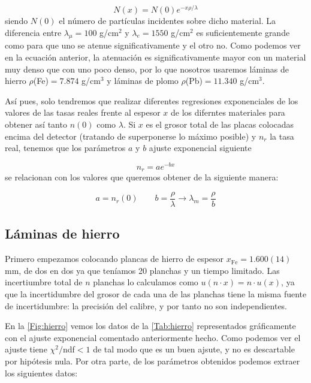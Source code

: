\documentclass[11pt]{article}
\begin{document}
\begin{equation}
	N(x)  = N(0) e^{-x\rho/\lambda}
\end{equation}
siendo $N(0)$ el número de partículas incidentes sobre dicho material. La diferencia entre $\lambda_\mu=100$ g/cm$^2$ y $\lambda_e=1550$ g/cm$^2$ es suficientemente grande como para que uno se atenue significativamente y el otro no. Como podemos ver en la ecuación anterior, la atenuación es significativamente mayor con un material muy denso que con uno poco denso, por lo que nosotros usaremos láminas de hierro $\rho$(Fe)$=7.874$ g/cm$^3$ y láminas de plomo $\rho$(Pb)$=11.340$ g/cm$^3$. 

Así pues, solo tendremos que realizar diferentes regresiones exponenciales de los valores de las tasas reales frente al espesor $x$ de los diferntes materiales para obtener así tanto $n(0)$ como $\lambda$. Si $x$ es el grosor total de las placas colocadas encima del detector (tratando de superponerse lo máximo posible) y $n_r$ la tasa real, tenemos que los parámetros $a$ y $b$ ajuste exponencial siguiente

\begin{equation}
	n_r = a e^{-bx}
\end{equation}
se relacionan con los valores que queremos obtener de la siguiente manera:

\begin{equation}
	a = n_r(0) \qquad b = \frac{\rho}{\lambda} \rightarrow \lambda_m = \frac{\rho}{b}
\end{equation}



\subsection{Láminas de hierro}

Primero empezamos colocando plancas de hierro de espesor $x_{\text{Fe}}=1.600(14)$ mm, de dos en dos ya que teníamos 20 planchas y un tiempo limitado. Las incertiumbre total de $n$ planchas lo calculamos como $u(n\cdot x) = n \cdot u(x)$, ya que la incertidumbre del grosor de cada una de las planchas tiene la misma fuente de incertidumbre: la precisión del calibre, y por tanto no son independientes. 

En la \cref{Fig:hierro} vemos los datos de la \cref{Tab:hierro} representados gráficamente con el ajuste exponencial comentado anteriormente hecho. Como podemos ver el ajuste tiene $\chi^2/$ndf$<1$ de tal modo que es un buen ajsute, y no es descartable por hipótesis nula. Por otra parte, de los parámetros obtenidos podemos extraer los siguientes datos: 
\end{document}
